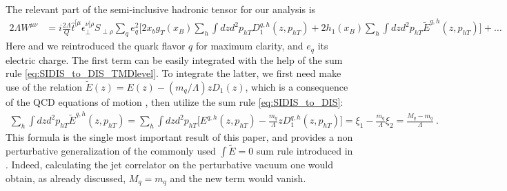 \documentclass[preprintnumbers,floatfix,nofootinbib]{revtex4}
\newcommand{\mj}{M_q}
\newcommand{\mq}{m_q}
\begin{document}
The relevant part of the semi-inclusive hadronic tensor for our analysis is 
\begin{align}
  \label{eq:Wsidis_ini}
  2 \Lambda  W^{\mu\nu}
    & = i \frac{2\Lambda}{Q} \hat t^{[\mu}_{\phantom \perp} 
    \epsilon_\perp^{\nu]\rho}S_{\perp\rho} 
    \sum_q e_q^2
    \bigg[ 2 x_b g_T(x_B) \sum_h \int dz d^2p_{hT} D_1^{q,h}(z,p_{hT}) 
  + 2 h_1(x_B) \sum_h \int dz d^2p_{hT} \tilde E^{q,h}(z,p_{hT}) \bigg] + \ldots
\end{align}
Here and we reintroduced the quark flavor $q$ for maximum clarity, and $e_q$ its electric charge.
The first term can be easily integrated with the help of the sum rule
\eqref{eq:SIDIS_to_DIS_TMDlevel}. To integrate the latter, we first need make
use of the relation $\tilde E(z) = E(z) - (\mq/\Lambda) z D_1(z)$, which is a
consequence of the QCD equations of motion \cite{Bacchetta:2006tn}, then
utilize the sum rule \eqref{eq:SIDIS_to_DIS}: 
\begin{align}
  \sum_h \int dz d^2p_{hT} \tilde E^{q,h}(z,p_{hT}) 
    = \sum_h \int dz d^2p_{hT} \Big[ E^{q,h}(z,p_{hT}) - \frac{\mq}{\Lambda} z D_1^{q,h}(z,p_{hT}) \Big]
    = \xi_1 - \frac{\mq}{\Lambda} \xi_2 = \frac{\mj - \mq}{\Lambda} \ .
\end{align}
This formula is the single most important result of this paper, and provides a
non perturbative generalization of the commonly used $\int\tilde E =0$ sum
rule introduced in \cite{Jaffe:1996zw}. Indeed, calculating the jet correlator 
on the perturbative vacuum one would obtain, as already discussed, $\mj=\mq$
and the new term would vanish.
\end{document}
